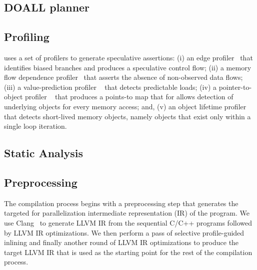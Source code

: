 %

\subsection{DOALL planner}
\label{planner}


\subsection{Profiling}

\name uses a set of profilers to generate speculative assertions:
%
(i) an edge profiler~\cite{LLVM:CGO04} that identifies biased
branches and produces a speculative control flow;
%
(ii) a memory flow dependence profiler~\cite{chen:04:cc} that asserts
the absence of non-observed data flows;
%
(iii) a value-prediction profiler ~\cite{gabbay:97:micro} that detects predictable loads;
%
(iv) a pointer-to-object profiler ~\cite{johnson:12:pldi}
that produces a points-to map that for allows detection of underlying objects
for every memory access; and,
%
(v) an object lifetime profiler ~\cite{johnson:12:pldi}
that detects short-lived memory objects, namely objects that exist only within a
single loop iteration.
%

\subsection {Static Analysis}


% 


\subsection{Preprocessing}

The compilation process begins with a preprocessing step that
generates the targeted for parallelization intermediate representation
(IR) of the program. We use Clang~\cite{LLVM:CGO04} to generate LLVM IR
from the sequential C/C++ programs followed by LLVM IR optimizations.
We then perform a pass of selective profile-guided
inlining and finally another round of LLVM IR optimizations to produce
the target LLVM IR that is used as the starting point for the rest of
the compilation process.

